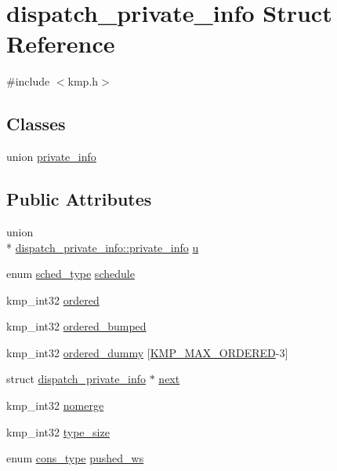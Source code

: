 \hypertarget{structdispatch__private__info}{\section{dispatch\-\_\-private\-\_\-info Struct Reference}
\label{structdispatch__private__info}
}


{\ttfamily \#include $<$kmp.\-h$>$}

\subsection*{Classes}
\begin{DoxyCompactItemize}
\item 
union \hyperlink{uniondispatch__private__info_1_1private__info}{private\-\_\-info}
\end{DoxyCompactItemize}
\subsection*{Public Attributes}
\begin{DoxyCompactItemize}
\item 
union \\*
\hyperlink{uniondispatch__private__info_1_1private__info}{dispatch\-\_\-private\-\_\-info\-::private\-\_\-info} \hyperlink{structdispatch__private__info_add5d0eaadae18cc00b471cbb7a147c3e}{u}
\item 
enum \hyperlink{group__WORK__SHARING_gadcaf200537aaa0218a60c398438f81be}{sched\-\_\-type} \hyperlink{structdispatch__private__info_a2144fb89314b5bce245276c9a64c0e59}{schedule}
\item 
kmp\-\_\-int32 \hyperlink{structdispatch__private__info_a340e0ba4ef87cb74881b87fb8f511db6}{ordered}
\item 
kmp\-\_\-int32 \hyperlink{structdispatch__private__info_a42cf2fd3ce208f4745eac84f8999f7ea}{ordered\-\_\-bumped}
\item 
kmp\-\_\-int32 \hyperlink{structdispatch__private__info_aa30ee07b35670f9ebddaa0ea4a952f52}{ordered\-\_\-dummy} \mbox{[}\hyperlink{kmp_8h_ab5cc9eb736cfbc3fe74fc2324c0b19be}{K\-M\-P\-\_\-\-M\-A\-X\-\_\-\-O\-R\-D\-E\-R\-E\-D}-\/3\mbox{]}
\item 
struct \hyperlink{structdispatch__private__info}{dispatch\-\_\-private\-\_\-info} $\ast$ \hyperlink{structdispatch__private__info_a1703e91ca6531889f397ad3ea0083fbe}{next}
\item 
kmp\-\_\-int32 \hyperlink{structdispatch__private__info_a1f6f76a7af47bc756e9ef3f785ec0630}{nomerge}
\item 
kmp\-\_\-int32 \hyperlink{structdispatch__private__info_ad6c8ec5e16b0e4109cc12de869a10b67}{type\-\_\-size}
\item 
enum \hyperlink{kmp_8h_a1582e7ddc609220a660d10244ef3e315}{cons\-\_\-type} \hyperlink{structdispatch__private__info_a72c2347692c0d4b2cfde90cd309e045a}{pushed\-\_\-ws}
\end{DoxyCompactItemize}


